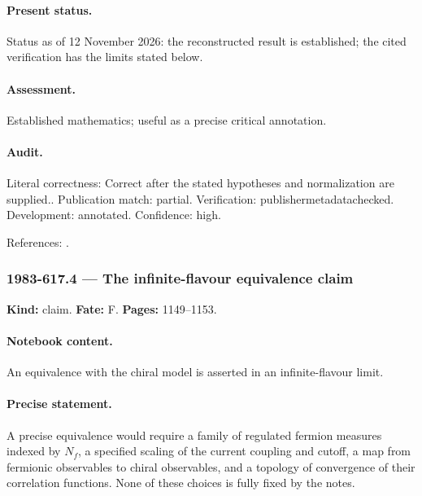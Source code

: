 \paragraph{Present status.} Status as of 12 November 2026: the reconstructed result is established; the cited verification has the limits stated below.

\paragraph{Assessment.} Established mathematics; useful as a precise critical annotation.

\paragraph{Audit.} Literal correctness: Correct after the stated hypotheses and normalization are supplied.. Publication match: partial. Verification: publishermetadatachecked. Development: annotated. Confidence: high.

\noindent References: \citep{polyakovwiegmann1983goldstone,polyakovwiegmann1984multivalued}.\par

\subsubsection{1983-617.4 --- The infinite-flavour equivalence claim}

\label{item:1983-617.4}

\noindent\textbf{Kind:} claim. \textbf{Fate:} F. \textbf{Pages:} 1149--1153.\par

\paragraph{Notebook content.} An equivalence with the chiral model is asserted in an infinite-flavour limit.

\paragraph{Precise statement.} A precise equivalence would require a family of regulated fermion measures indexed by $N_f$, a specified scaling of the current coupling and cutoff, a map from fermionic observables to chiral observables, and a topology of convergence of their correlation functions. None of these choices is fully fixed by the notes.

